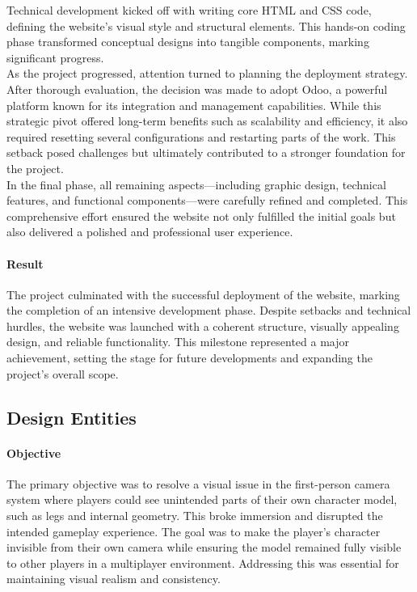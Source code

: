 \documentclass{article}
\begin{document}
Technical development kicked off with writing core HTML and CSS code, defining the website's visual style and structural elements. This hands-on coding phase transformed conceptual designs into tangible components, marking significant progress.\\

As the project progressed, attention turned to planning the deployment strategy. After thorough evaluation, the decision was made to adopt Odoo, a powerful platform known for its integration and management capabilities. While this strategic pivot offered long-term benefits such as scalability and efficiency, it also required resetting several configurations and restarting parts of the work. This setback posed challenges but ultimately contributed to a stronger foundation for the project.\\

In the final phase, all remaining aspects—including graphic design, technical features, and functional components—were carefully refined and completed. This comprehensive effort ensured the website not only fulfilled the initial goals but also delivered a polished and professional user experience.

\paragraph{Result}\hfill

The project culminated with the successful deployment of the website, marking the completion of an intensive development phase. Despite setbacks and technical hurdles, the website was launched with a coherent structure, visually appealing design, and reliable functionality. This milestone represented a major achievement, setting the stage for future developments and expanding the project's overall scope.










\newpage
\subsection{Design Entities}
\paragraph{Objective}\hfill

The primary objective was to resolve a visual issue in the first-person camera system where players could see unintended parts of their own character model, such as legs and internal geometry. This broke immersion and disrupted the intended gameplay experience. The goal was to make the player's character invisible from their own camera while ensuring the model remained fully visible to other players in a multiplayer environment. Addressing this was essential for maintaining visual realism and consistency.
\end{document}
